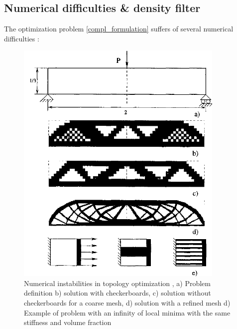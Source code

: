 \subsection{Numerical difficulties \& density filter}
The optimization problem \ref{compl_formulation} suffers of several numerical difficulties \cite{sigmund1998numerical}:
\begin{figure}[ht]
\centering
\includegraphics[width=10cm]{images/Ch2/numerical_instabilities_TO}
\caption{Numerical instabilities in topology optimization \cite{sigmund1998numerical}, a) Problem definition b) solution with checkerboards, c) solution without checkerboards for a coarse mesh, d) solution with a refined mesh d) Example of problem with an infinity of local minima with the same stiffness and volume fraction}
\label{fig.2.8b}
\end{figure}
